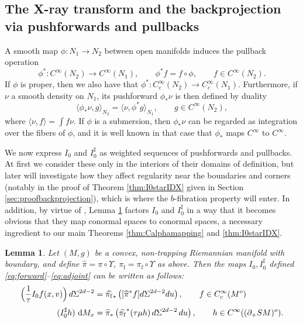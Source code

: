 \documentclass[11pt]{article}
\newcommand{\Subsection}{\subsection}
\theoremstyle{plain}
\newtheorem{Lemma}[Theorem]{Lemma}
\theoremstyle{definition}
\theoremstyle{remark}
\newcommand{\adj}{I_0^\sharp}
\newcommand{\hpi}{\widehat{\pi}}
\newcommand {\dM}{\mathrm{d}M}
\newcommand{\foot}{{\pi_{\mathrm f}}}
\newcommand{\hF}{\widehat{\foot}}
\begin{document}
\Subsection{The X-ray transform and the backprojection via pushforwards and pullbacks} \label{sec:compounds}

A smooth map $\phi:N_1\to N_2$ between open manifolds induces the pullback operation
\begin{equation*}
\phi^*\colon C^\infty(N_2) \to C^\infty(N_1), \qquad \phi^* f = f\circ \phi, \qquad f\in C^\infty(N_2).
\end{equation*}
If $\phi$ is proper, then we also have that $\phi^*\colon C_c^{\infty}(N_2)\to C_c^{\infty}(N_1)$. Furthermore, if $\nu$ a smooth
density on $N_1$, its pushforward $\phi_*\nu$ is then defined by duality
\begin{equation*}
\langle \phi_* \nu, g \rangle_{N_2} = \langle \nu, \phi^* g \rangle_{N_1}, \qquad g\in C^\infty(N_2),
\end{equation*}
where $\langle \nu, f\rangle = \int f \nu$. If $\phi$ is a submersion, then $\phi_* \nu$ can be regarded
as integration over the fibers of $\phi$, and it is well known in that case that $\phi_*$ maps $C^\infty$ to $C^\infty$.

We now express $I_0$ and $\adj $ as weighted sequences of pushforwards and pullbacks. At first we consider these only in the interiors of their domains of definition, but later will investigate how they affect regularity near the boundaries and corners (notably in the proof of Theorem \ref{thm:I0starIDX} given in Section \ref{sec:proofbackprojection}), which is where the $b$-fibration property will enter. In addition, by virtue of \cite[Th.\,3 \& 5]{Melrose1992}, Lemma \ref{lem:Irewrite} factors $I_0$ and $\adj$ in a way that it becomes obvious that they map conormal spaces to conormal spaces, a necessary ingredient to our main Theorems \ref{thm:Calphamapping} and \ref{thm:I0starIDX}.

\begin{Lemma}\label{lem:Irewrite}
Let $(M,g)$ be a convex, non-trapping Riemannian manifold with boundary, and define $\hpi = \pi\circ\Upsilon$,
$\hF = \foot\circ\Upsilon$ as above.
Then the maps $I_0, \adj $ defined \eqref{eq:forward}--\eqref{eq:adjoint} can be written as follows:
\begin{align}
\Bigl(\frac{1}{\tau} I_0 f(x,v) \Bigr)\, d\Sigma^{2d-2} &= \hF_* \left([\hpi^* f]d\Sigma^{2d-2} du \right), \qquad f\in C_{c}^\infty(M^{o}) \label{eq:I0} \\[0.5ex]
(\adj h)\ \dM_x &= \hpi_* \left(\hF^* (\tau\mu h)\,d\Sigma^{2d-2}\,du\right), \qquad h\in C^\infty((\partial_+ SM)^{o}). \label{eq:I0star}
\end{align}
\end{Lemma}
\end{document}

